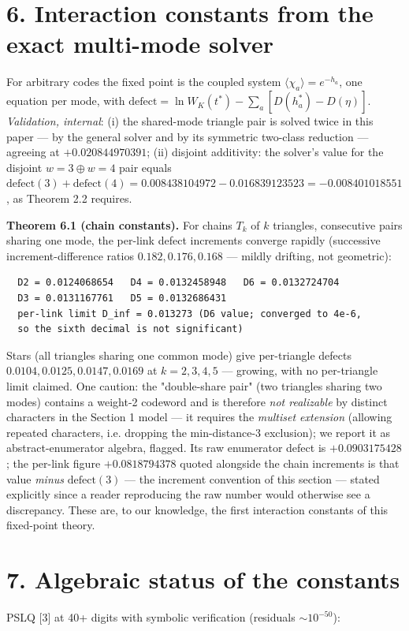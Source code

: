 \documentclass[11pt]{article}
\begin{document}
\section*{6. Interaction constants from the exact multi-mode solver}
For arbitrary codes the fixed point is the coupled system $\langle\chi_a\rangle = e^{-h_a}$, one equation per mode, with $\mathrm{defect} = \ln W_K(t^*) - \sum_a [D(h_a^*) - D(\eta)]$. \emph{Validation, internal}: (i) the shared-mode triangle pair is solved twice in this paper — by the general solver and by its symmetric two-class reduction — agreeing at $+0.020844970391$; (ii) disjoint additivity: the solver's value for the disjoint $w{=}3 \oplus w{=}4$ pair equals $\mathrm{defect}(3) + \mathrm{defect}(4) = 0.008438104972 - 0.016839123523 = -0.008401018551$, as Theorem 2.2 requires.

\textbf{Theorem 6.1 (chain constants).}  For chains $T_k$ of $k$ triangles, consecutive pairs sharing one mode, the per-link defect increments converge rapidly (successive increment-difference ratios $0.182, 0.176, 0.168$ — mildly drifting, not geometric):

\begin{small}\begin{verbatim}
  D2 = 0.0124068654   D4 = 0.0132458948   D6 = 0.0132724704
  D3 = 0.0131167761   D5 = 0.0132686431
  per-link limit D_inf = 0.013273 (D6 value; converged to 4e-6,
  so the sixth decimal is not significant)
\end{verbatim}\end{small}
Stars (all triangles sharing one common mode) give per-triangle defects $0.0104, 0.0125, 0.0147, 0.0169$ at $k = 2, 3, 4, 5$ — growing, with no per-triangle limit claimed.  One caution: the "double-share pair" (two triangles sharing two modes) contains a weight-2 codeword and is therefore \emph{not realizable} by distinct characters in the Section 1 model — it requires the \emph{multiset extension} (allowing repeated characters, i.e. dropping the min-distance-3 exclusion); we report it as abstract-enumerator algebra, flagged.  Its raw enumerator defect is $+0.0903175428$; the per-link figure $+0.0818794378$ quoted alongside the chain increments is that value \emph{minus} $\mathrm{defect}(3)$ — the increment convention of this section — stated explicitly since a reader reproducing the raw number would otherwise see a discrepancy. These are, to our knowledge, the first interaction constants of this fixed-point theory.

\section*{7. Algebraic status of the constants}
PSLQ [3] at 40+ digits with symbolic verification (residuals $\sim 10^{-50}$):
\end{document}
